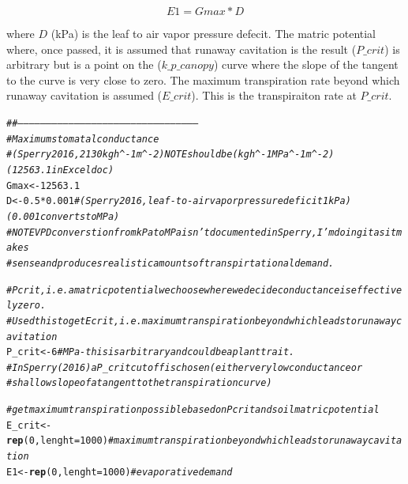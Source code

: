 \documentclass[a4paper]{article}\usepackage[]{graphicx}\usepackage[]{color}
\makeatletter
\newcommand{\hlnum}[1]{\textcolor[rgb]{0.686,0.059,0.569}{#1}}%
\newcommand{\hlcom}[1]{\textcolor[rgb]{0.678,0.584,0.686}{\textit{#1}}}%
\newcommand{\hlopt}[1]{\textcolor[rgb]{0,0,0}{#1}}%
\newcommand{\hlstd}[1]{\textcolor[rgb]{0.345,0.345,0.345}{#1}}%
\newcommand{\hlkwb}[1]{\textcolor[rgb]{0.69,0.353,0.396}{#1}}%
\newcommand{\hlkwc}[1]{\textcolor[rgb]{0.333,0.667,0.333}{#1}}%
\newcommand{\hlkwd}[1]{\textcolor[rgb]{0.737,0.353,0.396}{\textbf{#1}}}%
\newenvironment{kframe}{%
 \def\at@end@of@kframe{}%
 \ifinner\ifhmode%
  \def\at@end@of@kframe{\end{minipage}}%
  \begin{minipage}{\columnwidth}%
 \fi\fi%
 \def\FrameCommand##1{\hskip\@totalleftmargin \hskip-\fboxsep
 \colorbox{shadecolor}{##1}\hskip-\fboxsep
     \hskip-\linewidth \hskip-\@totalleftmargin \hskip\columnwidth}%
 \MakeFramed {\advance\hsize-\width
   \@totalleftmargin\z@ \linewidth\hsize
   \@setminipage}}%
 {\par\unskip\endMakeFramed%
 \at@end@of@kframe}
\newenvironment{knitrout}{}{} %
\makeatother
\begin{document}
\begin{equation}
E1 = Gmax * D
\end{equation}

\noindent where $D$ (kPa) is the leaf to air vapor pressure defecit. The matric potential where, once passed, it is assumed that runaway cavitation is the result ($P\_crit$) is arbitrary but is a point on the ($k\_p\_canopy$) curve where the slope of the tangent to the curve is very close to zero. The maximum transpiration rate beyond which runaway cavitation is assumed ($E\_crit$). This is the transpiraiton rate at $P\_crit$.   
\begin{knitrout}
\color{fgcolor}\begin{kframe}
\begin{alltt}
\hlcom{##-----------------------------------------------------------------------------------------------}
\hlcom{# Maximum stomatal conductance}
\hlcom{# (Sperry 2016, 2130 kg h^-1 m^-2) NOTE should be (kg h^-1 MPa^-1 m^-2) (12563.1 in Excel doc)}
\hlstd{Gmax} \hlkwb{<-} \hlnum{12563.1}
\hlstd{D} \hlkwb{<-} \hlnum{0.5}\hlopt{*}\hlnum{0.001} \hlcom{#(Sperry 2016, leaf-to-air vapor pressure deficit 1 kPa)(0.001 converts to MPa) }
\hlcom{# NOTE VPD converstion from kPa to MPa isn't documented in Sperry, I'm doing it as it makes }
\hlcom{# sense and produces realistic amounts of transpirtational demand. }

\hlcom{# Pcrit, i.e. a matric potential we choose where we decide conductance is effectively zero. }
\hlcom{# Used this to get Ecrit, i.e. maximum transpiration beyond which leads to runaway cavitation  }
\hlstd{P_crit} \hlkwb{<-} \hlnum{6} \hlcom{# MPa - this is arbitrary and could be a plant trait. }
\hlcom{# In Sperry (2016) a P_crit cutoff is chosen (either very low conductance or }
\hlcom{# shallow slope of a tangent to the transpiration curve)}

\hlcom{# get maximum transpiration possible based on Pcrit and soil matric potential }
\hlstd{E_crit} \hlkwb{<-} \hlkwd{rep}\hlstd{(}\hlnum{0}\hlstd{,} \hlkwc{lenght}\hlstd{=}\hlnum{1000}\hlstd{)} \hlcom{# maximum transpiration beyond which leads to runaway cavitation}
\hlstd{E1} \hlkwb{<-} \hlkwd{rep}\hlstd{(}\hlnum{0}\hlstd{,} \hlkwc{lenght}\hlstd{=}\hlnum{1000}\hlstd{)} \hlcom{# evaporative demand}
\end{alltt}
\end{kframe}
\end{knitrout}
\end{document}
